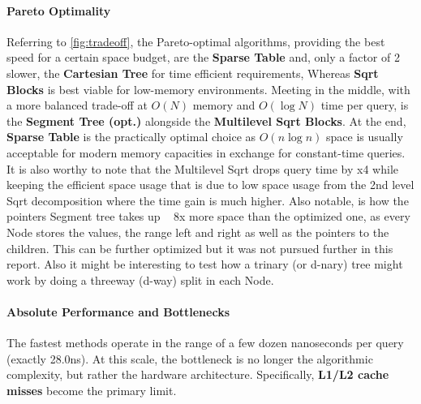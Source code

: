 \documentclass[a4paper,UKenglish,cleveref,thm-restate]{lipics-v2021}
\begin{document}
\paragraph{Pareto Optimality}
Referring to \cref{fig:tradeoff}, the Pareto-optimal algorithms, providing the best speed for a certain space budget, are the \textbf{Sparse Table} and, only a factor of 2 slower, the \textbf{Cartesian Tree} for time efficient requirements, Whereas \textbf{Sqrt Blocks} is best viable for low-memory environments. Meeting in the middle, with a more balanced trade-off at $O(N)$ memory and $O(\log N)$ time per query, is the \textbf{Segment Tree (opt.)} alongside the \textbf{Multilevel Sqrt Blocks}. At the end, \textbf{Sparse Table} is the practically optimal choice as $O(n \log n)$ space is usually acceptable for modern memory capacities in exchange for constant-time queries.
It is also worthy to note that the Multilevel Sqrt drops query time by x4 while keeping the efficient space usage that is due to low space usage from the 2nd level Sqrt decomposition where the time gain is much higher. Also notable, is how the pointers Segment tree takes up ~ 8x more space than the optimized one, as every Node stores the values, the range left and right as well as the pointers to the children. This can be further optimized but it was not pursued further in this report. Also it might be interesting to test how a trinary (or d-nary) tree might work by doing a threeway (d-way) split in each Node.

\paragraph{Absolute Performance and Bottlenecks}
The fastest methods operate in the range of a few dozen nanoseconds per query (exactly 28.0ns). At this scale, the bottleneck is no longer the algorithmic complexity, but rather the hardware architecture. Specifically, \textbf{L1/L2 cache misses} become the primary limit.
\end{document}
